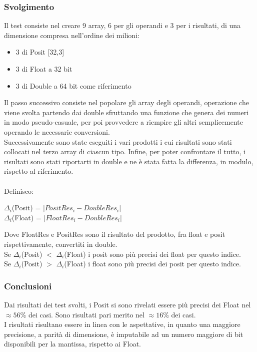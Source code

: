 \documentclass[a4paper,11pt]{article}
\begin{document}
\subsubsection{Svolgimento}
Il test consiste nel creare 9 array, 6 per gli operandi e 3 per i risultati, di una dimensione compresa nell'ordine dei milioni: \begin{itemize}
	\item 3 di Posit [32,3]
	\item 3 di Float a 32 bit 
	\item 3 di Double a 64 bit come riferimento
\end{itemize} Il passo successivo consiste nel popolare gli array degli operandi, operazione che viene svolta partendo dai double sfruttando una funzione che genera dei numeri in modo pseudo-casuale, per poi provvedere a riempire gli altri semplicemente operando le necessarie conversioni.\\
Successivamente sono state eseguiti i vari prodotti i cui risultati sono stati collocati nel terzo array di ciascun tipo. Infine, per poter confrontare il tutto, i risultati sono stati riportarti in double e ne è stata fatta la differenza, in modulo, rispetto al riferimento.\\\\ Definisco: \begin{center}  $\Delta_i$(Posit) = $|PositRes_i - DoubleRes_i|$  \\ $\Delta_i$(Float)  = $|FloatRes_i - DoubleRes_i|$ \end{center} 
Dove FloatRes e PositRes sono il risultato del prodotto, fra float e posit rispettivamente, convertiti in double. \\Se $\Delta_i$(Posit) $<$ $\Delta_i$(Float) i posit sono più precisi dei float per questo indice.\\ Se $\Delta_i$(Posit) $>$ $\Delta_i$(Float) i float sono più precisi dei posit per questo indice.

\subsubsection{Conclusioni}
Dai risultati dei test svolti, i Posit si sono rivelati essere più precisi dei Float nel $\approx56$\% dei casi. Sono risultati pari merito nel $\approx16$\% dei casi.\\
I risultati risultano essere in linea con le aspettative, in quanto una maggiore precisione, a parità di dimensione, è imputabile ad un numero maggiore di bit disponibili per la mantissa, rispetto ai Float. 
\end{document}
